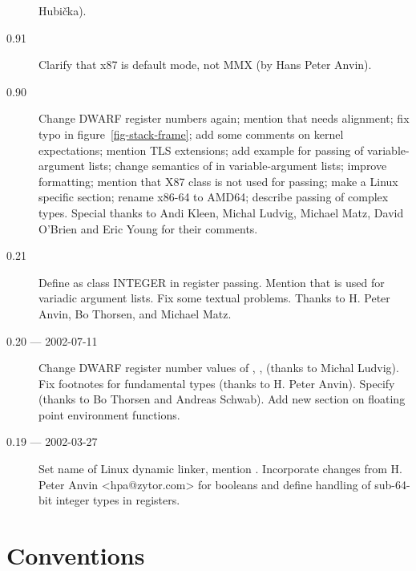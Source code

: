 \documentclass[12pt]{report}
\begin{document}
\begin{description}
  Hubi\v{c}ka).
\item[0.91] Clarify that x87 is default mode, not MMX (by Hans Peter
  Anvin).
\item[0.90]
  Change DWARF register
  numbers again; mention that  needs alignment; fix typo
  in figure~\ref{fig-stack-frame}; add some comments on kernel
  expectations; mention TLS extensions; add example for passing of
  variable-argument lists; change semantics of \RAX in
  variable-argument lists; improve formatting; mention that X87 class
  is not used for passing; make  a Linux specific
  section; rename x86-64 to AMD64; describe passing of complex types.
  Special thanks to Andi Kleen, Michal Ludvig, Michael Matz, David
  O'Brien and Eric Young for their comments.
\item[0.21] Define  as class INTEGER in register
  passing.  Mention that  is used for variadic argument lists.  Fix
  some textual problems.  Thanks to H. Peter Anvin, Bo Thorsen, and
  Michael Matz.
\item[0.20 --- 2002-07-11] Change DWARF register number values of
  \RBX, \RSI, \RSI (thanks to Michal Ludvig).  Fix footnotes for
  fundamental types (thanks to H. Peter Anvin). Specify 
  (thanks to Bo Thorsen and Andreas Schwab).  Add new section on
  floating point environment functions.
\item[0.19 --- 2002-03-27] Set name of Linux dynamic linker, mention
  .
  Incorporate changes from H. Peter Anvin <hpa@zytor.com>
  for booleans and define handling of sub-64-bit integer types in
  registers.
\end{description}










\chapter{Conventions}





\appendix



\end{document}
